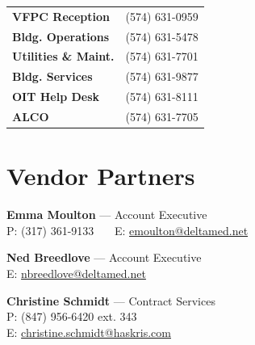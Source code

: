 \documentclass[10pt,a4paper,landscape]{article}
\begin{document}
\begin{multicols}{3}
\begin{tcolorbox}[title={\small\bfseries\color{ndblue} FACILITIES \& SERVICES}, colbacktitle=cardbg, coltitle=ndblue, detach title, before upper={\tcbtitle\vspace{4pt}\hrule\vspace{6pt}}]
\begin{tabularx}{\linewidth}{@{} X R @{}}
    \textbf{VFPC Reception} & (574) 631-0959 \\
    \textbf{Bldg. Operations} & (574) 631-5478 \\
    \textbf{Utilities \& Maint.} & (574) 631-7701 \\
    \textbf{Bldg. Services} & (574) 631-9877 \\
    \textbf{OIT Help Desk} & (574) 631-8111 \\
    \textbf{ALCO} & (574) 631-7705 \\
\end{tabularx}
\end{tcolorbox}



\section*{Vendor Partners}

\begin{tcolorbox}[title={\small\bfseries\color{ndblue} DELTA MEDICAL SYSTEMS}, colbacktitle=cardbg, coltitle=ndblue, detach title, before upper={\tcbtitle\vspace{4pt}\hrule\vspace{6pt}}]
    \textbf{Emma Moulton} \small{--- Account Executive} \\
    \small{P: (317) 361-9133 \ \textbar\ \ E: \href{mailto:emoulton@deltamed.net}{emoulton@deltamed.net}}

    \vspace{4pt}
    \textbf{Ned Breedlove} \small{--- Account Executive} \\
    \small{E: \href{mailto:nbreedlove@deltamed.net}{nbreedlove@deltamed.net}}
\end{tcolorbox}

\begin{tcolorbox}[title={\small\bfseries\color{ndblue} HASKRIS}, colbacktitle=cardbg, coltitle=ndblue, detach title, before upper={\tcbtitle\vspace{4pt}\hrule\vspace{6pt}}]
    \textbf{Christine Schmidt} \small{--- Contract Services} \\
    \small{P: (847) 956-6420 ext. 343} \\
    \small{E: \href{mailto:christine.schmidt@haskris.com}{christine.schmidt@haskris.com}}
\end{tcolorbox}


\end{multicols}
\end{document}
